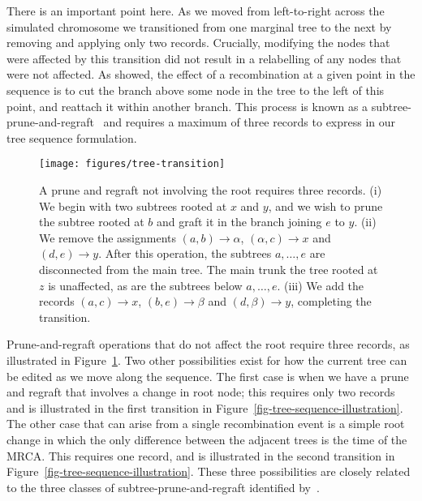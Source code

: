 \documentclass[10pt]{article}
\begin{document}
There is an important point here. As we moved from left-to-right across the
simulated chromosome we transitioned from one marginal tree to the next by
removing and applying only two records. Crucially, modifying the nodes that
were affected by this transition did not result in a relabelling of any
nodes that were not affected.
As \citet{wh99,wh99b} showed, the effect of a
recombination at a given point in the sequence is to cut the branch above some
node in the tree to the left of this point, and reattach it within another
branch. This process is known as a subtree-prune-and-regraft~\citep{s03,s06}
and requires a maximum of three records to express in our tree sequence
formulation.

\begin{figure}
    \begin{center}
    \texttt{[image: figures/tree-transition]}
    \end{center}
    \caption{\label{fig-tree-transition} A prune and regraft not involving the
    root requires three records.
    (i) We begin with two subtrees rooted at $x$ and $y$, and we
    wish to prune the subtree rooted at $b$ and graft it in the branch
    joining $e$ to $y$.
    (ii) We remove the assignments $(a, b)\rightarrow \alpha$,
    $(\alpha, c) \rightarrow x$ and $(d, e) \rightarrow y$. After this operation,
    the subtrees $a,\dots,e$ are disconnected from the main tree. The main trunk
    the tree rooted at $z$ is unaffected, as are the subtrees below $a, \dots, e$.
    (iii) We add the records $(a ,c) \rightarrow x$,
    $(b, e) \rightarrow \beta$ and $(d, \beta) \rightarrow y$, completing the
    transition.
    }
\end{figure}

Prune-and-regraft operations that do not affect the root
require three records, as illustrated in Figure~\ref{fig-tree-transition}.
Two other possibilities exist
for how the current tree can be edited as we move along the sequence. The first
case is when we have a prune and regraft that involves a change in root
node; this requires only two records and is illustrated in the first transition
in Figure~\ref{fig-tree-sequence-illustration}. The other case that
can arise from a single recombination event is a simple root change in which
the only difference between the adjacent trees is the time of the MRCA. This
requires one record, and is illustrated in the second
transition in Figure~\ref{fig-tree-sequence-illustration}. These three
possibilities are closely related to the three classes of
subtree-prune-and-regraft identified by~\citet{s03,s06}.
\end{document}
